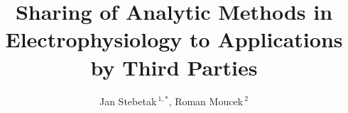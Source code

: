 \documentclass{frontiersSCNS} %
\def\firstAuthorLast{Sample {et~al.}} %
\def\Authors{Jan Stebetak\,$^{1,*}$, Roman Moucek\,$^{2}$}
\begin{document}
\onecolumn
{}

\title[Sharing of Analytic Methods in Electrophysiology to Applications by Third Parties]{Sharing of Analytic Methods in Electrophysiology to Applications by Third Parties}

\author[\firstAuthorLast ]{\Authors} %
\address{} %
\correspondance{} %

\extraAuth{}%


\maketitle

\end{document}
